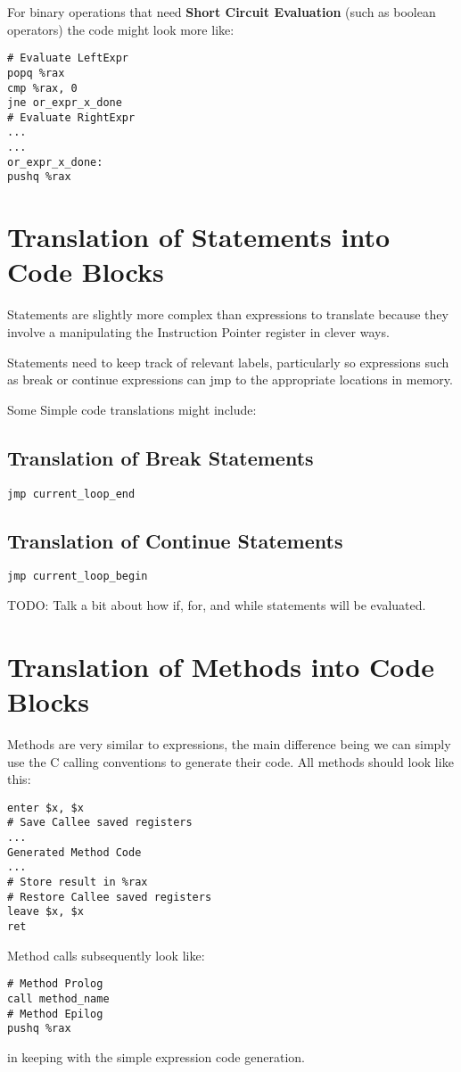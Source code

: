 \documentclass[11pt]{article}
\begin{document}
For binary operations that need \textbf{Short Circuit Evaluation} (such as boolean operators) the code might look more like: 

\begin{verbatim}
# Evaluate LeftExpr
popq %rax 
cmp %rax, 0
jne or_expr_x_done
# Evaluate RightExpr
...
...
or_expr_x_done: 
pushq %rax
\end{verbatim}


\section {Translation of Statements into Code Blocks}
Statements are slightly more complex than expressions to translate because they involve a manipulating the Instruction Pointer register in clever ways. 

Statements need to keep track of relevant labels, particularly so expressions such as break or continue expressions can jmp to the appropriate locations in memory. 

Some Simple code translations might include: 

\subsection{Translation of Break Statements} 

\begin{verbatim}
jmp current_loop_end
\end{verbatim}

\subsection{Translation of Continue Statements}

\begin{verbatim}
jmp current_loop_begin
\end{verbatim}

TODO: Talk a bit about how if, for, and while statements will be evaluated. 

\section {Translation of Methods into Code Blocks}
Methods are very similar to expressions, the main difference being we can simply use the C calling conventions to generate their code. All methods should look like this: 

\begin{verbatim}
enter $x, $x
# Save Callee saved registers
...
Generated Method Code
...
# Store result in %rax
# Restore Callee saved registers
leave $x, $x
ret
\end{verbatim}

Method calls subsequently look like: 
\begin{verbatim}
# Method Prolog
call method_name
# Method Epilog
pushq %rax
\end{verbatim}

in keeping with the simple expression code generation. 
\end{document}
